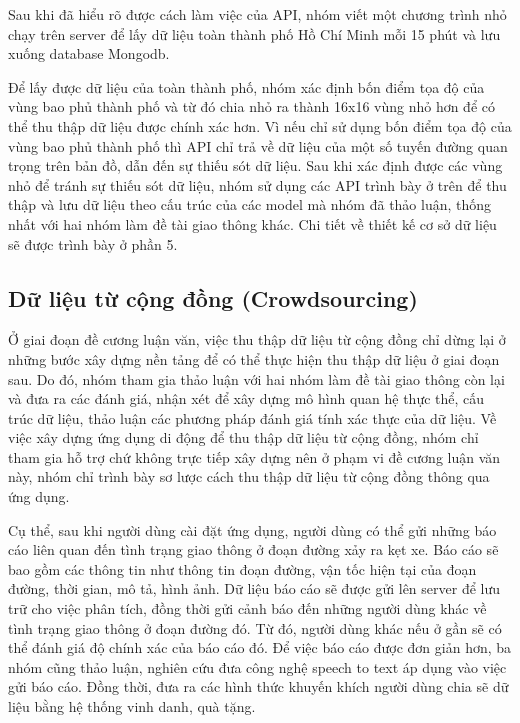 Sau khi đã hiểu rõ được cách làm việc của API, nhóm viết một chương trình nhỏ chạy trên server để lấy dữ liệu toàn thành phố Hồ Chí Minh mỗi 15 phút và lưu xuống database Mongodb.

Để lấy được dữ liệu của toàn thành phố, nhóm xác định bốn điểm tọa độ của vùng bao phủ thành phố và từ đó chia nhỏ ra thành 16x16 vùng nhỏ hơn để có thể thu thập dữ liệu được chính xác hơn. Vì nếu chỉ sử dụng bốn điểm tọa độ của vùng bao phủ thành phố thì API chỉ trả về dữ liệu của một số tuyến đường quan trọng trên bản đồ, dẫn đến sự thiếu sót dữ liệu. Sau khi xác định được các vùng nhỏ để tránh sự thiếu sót dữ liệu, nhóm sử dụng các API trình bày ở trên để thu thập và lưu dữ liệu theo cấu trúc của các model mà nhóm đã thảo luận, thống nhất với hai nhóm làm đề tài giao thông khác. Chi tiết về thiết kế cơ sở dữ liệu sẽ được trình bày ở phần 5.

\subsection{Dữ liệu từ cộng đồng (Crowdsourcing)}
Ở giai đoạn đề cương luận văn, việc thu thập dữ liệu từ cộng đồng chỉ dừng lại ở những bước xây dựng nền tảng để có thể thực hiện thu thập dữ liệu ở giai đoạn sau. Do đó, nhóm tham gia thảo luận với hai nhóm làm đề tài giao thông còn lại và đưa ra các đánh giá, nhận xét để xây dựng mô hình quan hệ thực thể, cấu trúc dữ liệu, thảo luận các phương pháp đánh giá tính xác thực của dữ liệu. Về việc xây dựng ứng dụng di động để thu thập dữ liệu từ cộng đồng, nhóm chỉ tham gia hỗ trợ chứ không trực tiếp xây dựng nên ở phạm vi đề cương luận văn này, nhóm chỉ trình bày sơ lược cách thu thập dữ liệu từ cộng đồng thông qua ứng dụng.

Cụ thể, sau khi người dùng cài đặt ứng dụng, người dùng có thể gửi những báo cáo liên quan đến tình trạng giao thông ở đoạn đường xảy ra kẹt xe. Báo cáo sẽ bao gồm các thông tin như thông tin đoạn đường, vận tốc hiện tại của đoạn đường, thời gian, mô tả, hình ảnh. Dữ liệu báo cáo sẽ được gửi lên server để lưu trữ cho việc phân tích, đồng thời gửi cảnh báo đến những người dùng khác về tình trạng giao thông ở đoạn đường đó. Từ đó, người dùng khác nếu ở gần sẽ có thể đánh giá độ chính xác của báo cáo đó. Để việc báo cáo được đơn giản hơn, ba nhóm cũng thảo luận, nghiên cứu đưa công nghệ speech to text áp dụng vào việc gửi báo cáo. Đồng thời, đưa ra các hình thức khuyến khích người dùng chia sẽ dữ liệu bằng hệ thống vinh danh, quà tặng.

